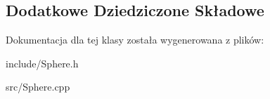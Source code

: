 \subsection*{Dodatkowe Dziedziczone Składowe}


Dokumentacja dla tej klasy została wygenerowana z plików\-:\begin{DoxyCompactItemize}
\item 
include/Sphere.\-h\item 
src/Sphere.\-cpp\end{DoxyCompactItemize}

